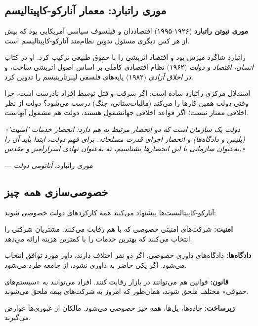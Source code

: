 \subsection{موری راتبارد: معمار آنارکو-کاپیتالیسم}


\textbf{موری نیوتن راتبارد} (۱۹۲۶-۱۹۹۵) اقتصاددان و فیلسوف سیاسی آمریکایی بود که بیش از هر کس دیگری مسئول تدوین نظام‌مند آنارکو-کاپیتالیسم است.

راتبارد شاگرد میزس بود و اقتصاد اتریشی را با حقوق طبیعی ترکیب کرد. او در کتاب \textit{انسان، اقتصاد و دولت} (۱۹۶۲) نظام اقتصادی کاملی بر اساس اصول اتریشی ساخت، و در \textit{اخلاق آزادی} (۱۹۸۲) پایه‌های فلسفی لیبرتارینیسم را تدوین کرد.

استدلال مرکزی راتبارد ساده است: اگر سرقت و قتل توسط افراد نادرست است، چرا وقتی دولت همین کارها را می‌کند (مالیات‌ستانی، جنگ) درست می‌شود؟ دولت از نظر اخلاقی ممتاز نیست؛ اگر قواعد اخلاقی جهانشمول هستند، دولت هم مشمول آنهاست.

\begin{tcolorbox}[
    enhanced,
    colback=centergreen!10,
    colframe=centergreen,
    boxrule=1.5pt,
    arc=5pt,
    fonttitle=\bfseries,
    title={\rl{🟢 نقل‌قول: موری راتبارد}}
]
\textit{«دولت یک سازمان است که دو انحصار مرتبط به هم دارد: انحصار خدمات 'امنیت' (پلیس و دادگاه‌ها) و انحصار اجرای قدرت مسلحانه. برای فهم دولت، ابتدا باید آن را به‌عنوان سازمانی با این انحصارها بشناسیم، نه به‌عنوان نهادی اسرارآمیز و مقدس.»}

\hfill --- موری راتبارد، \textit{آناتومی دولت}
\end{tcolorbox}

\subsection{خصوصی‌سازی همه چیز}


آنارکو-کاپیتالیست‌ها پیشنهاد می‌کنند همهٔ کارکردهای دولت خصوصی شوند:

\textbf{امنیت:} شرکت‌های امنیتی خصوصی که با هم رقابت می‌کنند. مشتریان شرکتی را انتخاب می‌کنند که بهترین خدمات را با کمترین هزینه ارائه می‌دهد.

\textbf{دادگاه‌ها:} دادگاه‌های داوری خصوصی. اگر دو نفر اختلاف دارند، داور مورد توافق انتخاب می‌شود. اگر یکی حاضر به داوری نشود، از جامعه طرد می‌شود.

\textbf{قانون:} قوانین هم می‌توانند در بازار رقابت کنند. افراد می‌توانند به «سیستم‌های حقوقی» مختلف ملحق شوند، همان‌طور که امروز به شرکت‌های بیمه ملحق می‌شوند.

\textbf{زیرساخت:} جاده‌ها، پل‌ها، همه چیز خصوصی می‌شود. مالکان از عبوری‌ها عوارض می‌گیرند.

